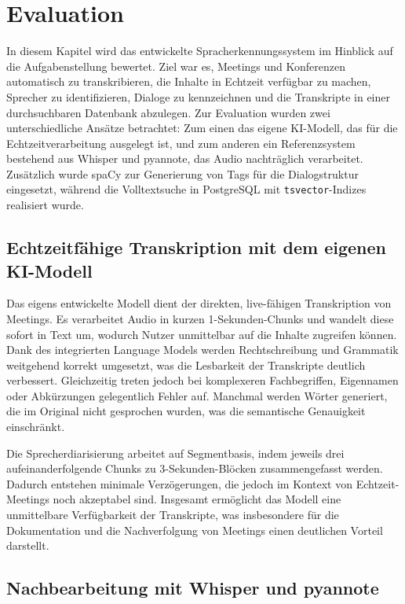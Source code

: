 \chapter{Evaluation}

In diesem Kapitel wird das entwickelte Spracherkennungssystem im Hinblick auf die
Aufgabenstellung bewertet. Ziel war es, Meetings und Konferenzen automatisch zu
transkribieren, die Inhalte in Echtzeit verfügbar zu machen, Sprecher zu identifizieren,
Dialoge zu kennzeichnen und die Transkripte in einer durchsuchbaren Datenbank abzulegen. 
Zur Evaluation wurden zwei unterschiedliche Ansätze betrachtet: Zum einen das
eigene KI-Modell, das für die Echtzeitverarbeitung ausgelegt ist, und zum anderen ein
Referenzsystem bestehend aus Whisper und pyannote, das Audio nachträglich verarbeitet. 
Zusätzlich wurde spaCy zur Generierung von Tags für die Dialogstruktur eingesetzt, 
während die Volltextsuche in PostgreSQL mit \texttt{tsvector}-Indizes realisiert wurde.

\section{Echtzeitfähige Transkription mit dem eigenen KI-Modell}

Das eigens entwickelte Modell dient der direkten, live-fähigen Transkription von Meetings. 
Es verarbeitet Audio in kurzen 1-Sekunden-Chunks und wandelt diese sofort in Text um, 
wodurch Nutzer unmittelbar auf die Inhalte zugreifen können. Dank des integrierten 
Language Models werden Rechtschreibung und Grammatik weitgehend korrekt umgesetzt, 
was die Lesbarkeit der Transkripte deutlich verbessert. Gleichzeitig treten jedoch 
bei komplexeren Fachbegriffen, Eigennamen oder Abkürzungen gelegentlich Fehler auf. 
Manchmal werden Wörter generiert, die im Original nicht gesprochen wurden, was die 
semantische Genauigkeit einschränkt.  

Die Sprecherdiarisierung arbeitet auf Segmentbasis, indem jeweils drei aufeinanderfolgende 
Chunks zu 3-Sekunden-Blöcken zusammengefasst werden. Dadurch entstehen minimale 
Verzögerungen, die jedoch im Kontext von Echtzeit-Meetings noch akzeptabel sind. Insgesamt
ermöglicht das Modell eine unmittelbare Verfügbarkeit der Transkripte, was insbesondere 
für die Dokumentation und die Nachverfolgung von Meetings einen deutlichen Vorteil darstellt.

\section{Nachbearbeitung mit Whisper und pyannote}

